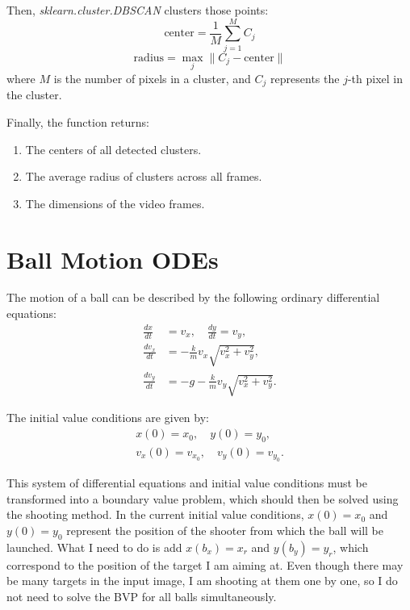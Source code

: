 \documentclass{article}
\begin{document}
	Then, \textit{sklearn.cluster.DBSCAN} clusters those points:
	$$
	\text{center} = \frac{1}{M} \sum_{j=1}^{M} C_j
	$$
	$$
	\text{radius} = \max_j \| C_j - \text{center} \|
	$$
	where $M$ is the number of pixels in a cluster, and $C_j$ represents the $j$-th pixel in the cluster.
	
	Finally, the function returns:
	\begin{enumerate}
		\item The centers of all detected clusters.
		\item The average radius of clusters across all frames.
		\item The dimensions of the video frames.
	\end{enumerate}
	
	\section*{Ball Motion ODEs}
	
	The motion of a ball can be described by the following ordinary differential equations:	
	\begin{align}
		\frac{dx}{dt} &= v_x, \quad \frac{dy}{dt} = v_y, \\
		\frac{dv_x}{dt} &= -\frac{k}{m} v_x \sqrt{v_x^2 + v_y^2}, \\
		\frac{dv_y}{dt} &= -g - \frac{k}{m} v_y \sqrt{v_x^2 + v_y^2}.
	\end{align}
	
	The initial value conditions are given by:
	\begin{align*}
		x(0) = x_0, \quad y(0) = y_0, \\
		v_x(0) = v_{x_0}, \quad v_y(0) = v_{y_0}.
	\end{align*}
	
	This system of differential equations and initial value conditions must be  transformed into a boundary value problem, which should then be solved using the shooting method. In the current initial value conditions, $x(0) = x_0$ and $y(0) = y_0$ represent the position of the shooter from which the ball will be launched. What I need to do is add $x(b_x) = x_r$ and $y(b_y) = y_r$, which correspond to the position of the target I am aiming at. Even though there may be many targets in the input image, I am shooting at them one by one, so I do not need to solve the BVP for all balls simultaneously.
	
\end{document}
